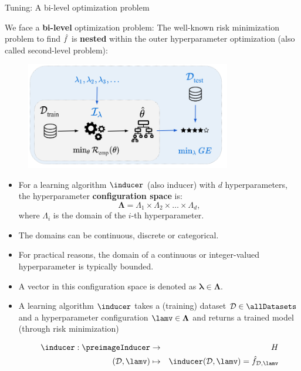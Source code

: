 \begin{vbframe}{Tuning: A bi-level optimization problem} 

\vspace{0.2cm} 

We face a \textbf{bi-level} optimization problem: The well-known risk minimization problem to find $\hat{f}$ is \textbf{nested} within the outer hyperparameter optimization (also called second-level problem):

\begin{center}
\begin{figure}
\includegraphics[width=0.8\textwidth]{figure_man/riskmin_bilevel3.png}
\end{figure}
\end{center}

\framebreak
  \footnotesize
  \begin{itemize}
    \item For a learning algorithm $\inducer$ (also inducer) with $d$ hyperparameters, the hyperparameter \textbf{configuration space} is:
      $$\bm{\Lambda}=\Lambda_{1} \times \Lambda_{2} \times \ldots \times \Lambda_{d},$$
      where $\Lambda_{i}$ is the domain of the $i$-th hyperparameter.
    \item The domains can be continuous, discrete or categorical.
    \item For practical reasons, the domain of a continuous or integer-valued hyperparameter is typically bounded.
    \item A vector in this configuration space is denoted as $\bm{\lambda} \in \bm{\Lambda}$.
    \item A learning algorithm $\inducer$ takes a (training) dataset $\D \in \allDatasets$ and a hyperparameter configuration $\lamv \in \bm{\Lambda}$ and returns a trained model (through risk minimization)

    \vspace*{-0.2cm}
  \begin{eqnarray*}
    \inducer: \preimageInducer &\to& \Hspace \\
    (\D, \lamv) &\mapsto& \inducer(\D, \lamv) = \hat f_{\D, \lamv}
  \end{eqnarray*}
  \end{itemize}


\end{vbframe}
